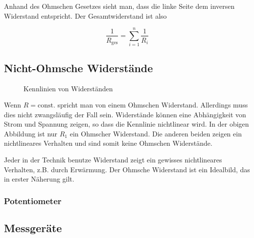 \documentclass[a4paper,german,12pt,smallheadings]{scrartcl}
\begin{document}
Anhand des Ohmschen Gesetzes sieht man, dass die linke Seite dem inversen
Widerstand entspricht. Der Gesamtwiderstand ist also

\begin{equation}
  \frac{1}{R_\text{ges}} = \sum_{i=1}^n \frac{1}{R_i}
\end{equation}

\subsection{Nicht-Ohmsche Widerstände}
\begin{figure}[H]
  \begin{center}
    \caption{Kennlinien von Widerständen}
  \end{center}
\end{figure}

Wenn $R = \text{const.}$ spricht man von einem Ohmschen Widerstand. Allerdings
muss dies nicht zwangsläufig der Fall sein. Widerstände können eine
Abhängigkeit von Strom und Spannung zeigen, so dass die Kennlinie nichtlinear
wird. In der obigen Abbildung ist nur $R_1$ ein Ohmscher Widerstand. Die
anderen beiden zeigen ein nichtlineares Verhalten und sind somit keine Ohmschen
Widerstände.

Jeder in der Technik benutze Widerstand zeigt ein gewisses nichtlineares
Verhalten, z.B. durch Erwärmung. Der Ohmsche Widerstand ist ein Idealbild, das
in erster Näherung gilt.


\subsubsection{Potentiometer}


\subsection{Messgeräte}
\end{document}
